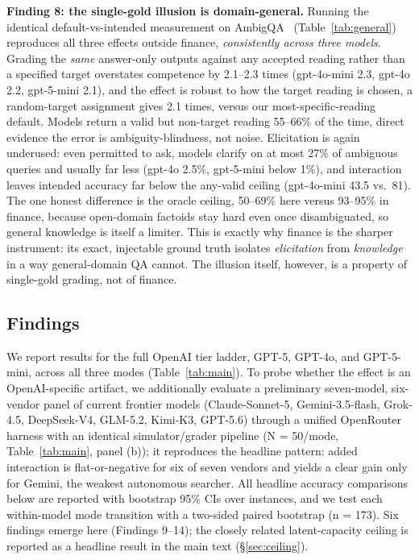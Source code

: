 \textbf{Finding 8: the single-gold illusion is domain-general.} Running the
identical default-vs-intended measurement on AmbigQA~\citep{min2020ambigqa}
(Table~\ref{tab:general}) reproduces all three effects outside finance,
\emph{consistently across three models}. Grading the \emph{same} answer-only outputs
against any accepted reading rather than a specified target overstates competence by
2.1--2.3 times (gpt-4o-mini 2.3, gpt-4o 2.2, gpt-5-mini 2.1), and the effect
is robust to how the target reading is chosen, a random-target assignment gives
2.1 times, versus our most-specific-reading default. Models return a valid but
non-target reading 55--66\% of the time, direct evidence the error is
ambiguity-blindness, not noise. Elicitation is again underused: even permitted to ask,
models clarify on at most 27\% of ambiguous queries and usually far less (gpt-4o
2.5\%, gpt-5-mini below 1\%), and interaction leaves intended accuracy far below the
any-valid ceiling (gpt-4o-mini 43.5 vs.\ 81). The one honest difference is the
oracle ceiling, 50--69\% here versus 93--95\% in finance, because
open-domain factoids stay hard even once disambiguated, so general knowledge is itself
a limiter. This is exactly why finance is the sharper instrument: its exact,
injectable ground truth isolates \emph{elicitation} from \emph{knowledge} in a way
general-domain QA cannot. The illusion itself, however, is a property of single-gold
grading, not of finance.

\subsection{Findings}

We report results for the full OpenAI tier ladder, GPT-5, GPT-4o, and
GPT-5-mini, across all three modes (Table~\ref{tab:main}). To probe whether the
effect is an OpenAI-specific artifact, we additionally evaluate a preliminary
seven-model, six-vendor panel of current frontier models (Claude-Sonnet-5,
Gemini-3.5-flash, Grok-4.5, DeepSeek-V4, GLM-5.2, Kimi-K3, GPT-5.6) through a
unified OpenRouter harness with an identical simulator/grader pipeline
(N = 50/mode, Table~\ref{tab:main}, panel (b)); it reproduces the headline pattern:
added interaction is flat-or-negative for six of seven vendors and yields a clear
gain only for Gemini, the weakest autonomous searcher. All headline accuracy
comparisons below are reported with
bootstrap 95\% CIs over instances, and we test each within-model mode
transition with a two-sided paired bootstrap (n = 173). Six findings emerge
here (Findings 9--14); the closely related latent-capacity ceiling is reported
as a headline result in the main text (\S\ref{sec:ceiling}).

